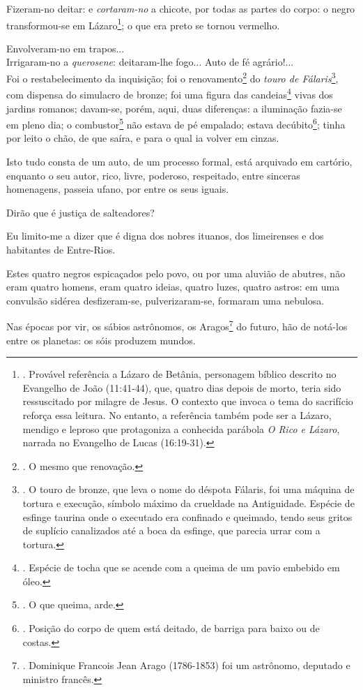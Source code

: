 Fizeram-no deitar: e \emph{cortaram-no} a chicote, por todas as partes
do corpo: o negro transformou-se em Lázaro\footnote{. Provável
  referência a Lázaro de Betânia, personagem bíblico descrito no
  Evangelho de João (11:41-44), que, quatro dias depois de morto, teria
  sido ressuscitado por milagre de Jesus. O contexto que invoca o tema
  do sacrifício reforça essa leitura. No entanto, a referência também
  pode ser a Lázaro, mendigo e leproso que protagoniza a conhecida
  parábola \emph{O Rico e Lázaro}, narrada no Evangelho de Lucas
  (16:19-31).}; o que era preto se tornou vermelho.

Envolveram-no em trapos...\\
Irrigaram-no a \emph{querosene}: deitaram-lhe fogo... Auto de fé
agrário!...\\
Foi o restabelecimento da inquisição; foi o renovamento\footnote{. O
  mesmo que renovação.} do \emph{touro de Fálaris}\footnote{. O touro de
  bronze, que leva o nome do déspota Fálaris, foi uma máquina de tortura
  e execução, símbolo máximo da crueldade na Antiguidade. Espécie de
  esfinge taurina onde o executado era confinado e queimado, tendo seus
  gritos de suplício canalizados até a boca da esfinge, que parecia
  urrar com a tortura.}, com dispensa do simulacro de bronze; foi uma
figura das candeias\footnote{. Espécie de tocha que se acende com a
  queima de um pavio embebido em óleo.} vivas dos jardins romanos;
davam-se, porém, aqui, duas diferenças: a iluminação fazia-se em pleno
dia; o combustor\footnote{. O que queima, arde.} não estava de pé
empalado; estava decúbito\footnote{. Posição do corpo de quem está
  deitado, de barriga para baixo ou de costas.}; tinha por leito o chão,
de que saíra, e para o qual ia volver em cinzas.

Isto tudo consta de um auto, de um processo formal, está arquivado em
cartório, enquanto o seu autor, rico, livre, poderoso, respeitado, entre
sinceras homenagens, passeia ufano, por entre os seus iguais.

Dirão que é justiça de salteadores?

Eu limito-me a dizer que é digna dos nobres ituanos, dos limeirenses e
dos habitantes de Entre-Rios.

Estes quatro negros espicaçados pelo povo, ou por uma aluvião de
abutres, não eram quatro homens, eram quatro ideias, quatro luzes,
quatro astros: em uma convulsão sidérea desfizeram-se, pulverizaram-se,
formaram uma nebulosa.

Nas épocas por vir, os sábios astrônomos, os Aragos\footnote{. Dominique
  Francois Jean Arago (1786-1853) foi um astrônomo, deputado e ministro
  francês.} do futuro, hão de notá-los entre os planetas: os sóis
produzem mundos.

